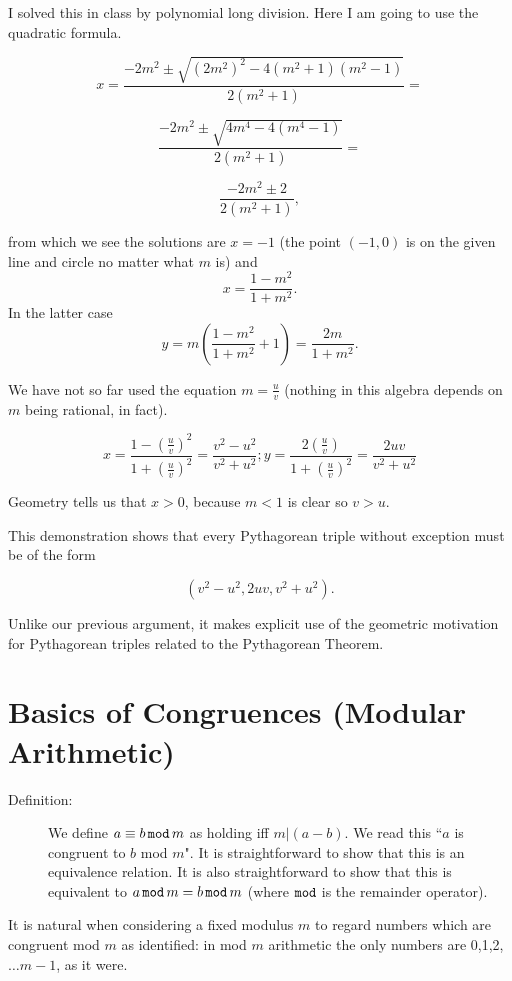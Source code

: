 \documentclass[12pt]{article}
\begin{document}
I solved this in class by polynomial long division.  Here I am going to use the quadratic formula.

$$x=\frac{-2m^2\pm\sqrt{(2m^2)^2 - 4(m^2+1)(m^2-1)}}{2(m^2+1)}=$$

$$\frac{-2m^2\pm\sqrt{4m^4 - 4(m^4-1)}}{2(m^2+1)}=$$

$$\frac{-2m^2\pm 2}{2(m^2+1)},$$

from which we see the solutions are $x=-1$ (the point $(-1,0)$ is on the given line and circle no matter what $m$ is)
and $$x=\frac{1-m^2}{1+m^2}.$$  In the latter case $$y=m(\frac{1-m^2}{1+m^2}+1)=\frac{2m}{1+m^2}.$$

We have not so far used the equation $m=\frac uv$ (nothing in this algebra depends on $m$ being rational, in fact).

$$x=\frac{1-(\frac uv)^2}{1+(\frac uv)^2}=\frac{v^2-u^2}{v^2+u^2};  y=\frac{2(\frac uv)}{1+(\frac uv)^2}=\frac{2uv}{v^2+u^2}$$

Geometry tells us that $x>0$, because $m<1$ is clear so $v>u$.

This demonstration shows that every Pythagorean triple without exception must be of the form 

$$(v^2-u^2,2uv,v^2+u^2).$$

Unlike our previous argument, it makes explicit use of the geometric motivation for Pythagorean triples related to the Pythagorean Theorem.  


\section{Basics of Congruences (Modular Arithmetic)}

\begin{description}
\item[Definition:]  We define $a \equiv b \,{\tt mod}\,m$ as holding iff $m|(a-b)$.  We read this ``$a$ is congruent to $b$ mod $m$".  It is straightforward to show that this is an equivalence relation.  It is also straightforward to show that this is equivalent to $a \,{\tt mod}\, m = b \,{\tt mod}\, m$ (where ${\tt mod}$ is the remainder operator).
\end{description}

It is natural when considering a fixed modulus $m$ to regard numbers which are congruent mod $m$ as identified:  in mod $m$ arithmetic the only numbers are 0,1,2,$\ldots m-1$, as it were.
\end{document}
